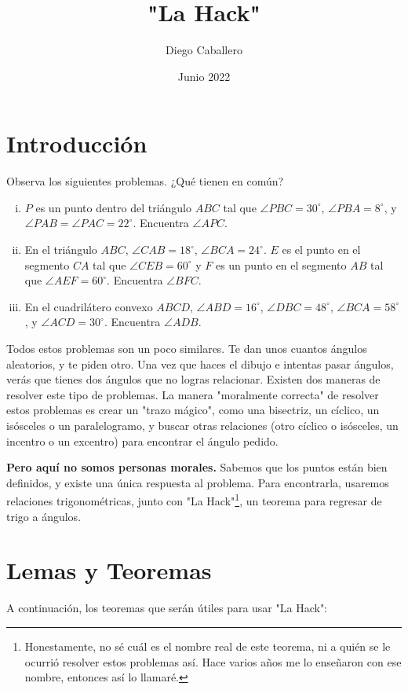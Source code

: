 \documentclass[11pt]{scrartcl}
\begin{document}
\title{"La Hack"}
\date{Junio 2022}
\author{Diego Caballero}
\maketitle

\section{Introducción}
    Observa los siguientes problemas. ¿Qué tienen en común?
    \begin{enumerate}[i)]
        \item $P$ es un punto dentro del triángulo $ABC$ tal que $\angle PBC = 30^{\circ}$, $\angle PBA = 8^{\circ}$, y $\angle PAB = \angle PAC = 22^{\circ}$. Encuentra $\angle APC$.

        \item En el triángulo $ABC$, $\angle CAB = 18^{\circ}$, $\angle BCA = 24 ^{\circ}$. $E$ es el punto en el segmento $CA$ tal que $\angle CEB = 60^{\circ}$ y $F$ es un punto en el segmento $AB$ tal que $\angle AEF = 60^{\circ}$. Encuentra $\angle BFC$.

        \item En el cuadrilátero convexo $ABCD$, $\angle ABD = 16^{\circ}$, $\angle DBC = 48^{\circ}$, $\angle BCA = 58^{\circ}$, y $\angle ACD = 30^{\circ}$. Encuentra $\angle ADB$.
    \end{enumerate}

    Todos estos problemas son un poco similares. Te dan unos cuantos ángulos aleatorios, y te piden otro. Una vez que haces el dibujo e intentas pasar ángulos, verás que tienes dos ángulos que no logras relacionar. Existen dos maneras de resolver este tipo de problemas. La manera "moralmente correcta" de resolver estos problemas es crear un "trazo mágico", como una bisectriz, un cíclico, un isósceles o un paralelogramo, y buscar otras relaciones (otro cíclico o isósceles, un incentro o un excentro) para encontrar el ángulo pedido.

    \textbf{Pero aquí no somos personas morales.} Sabemos que los puntos están bien definidos, y existe una única respuesta al problema. Para encontrarla, usaremos relaciones trigonométricas, junto con "La Hack"\footnote{Honestamente, no sé cuál es el nombre real de este teorema, ni a quién se le ocurrió resolver estos problemas así. Hace varios años me lo enseñaron con ese nombre, entonces así lo llamaré.}, un teorema para regresar de trigo a ángulos.

\section{Lemas y Teoremas}
    A continuación, los teoremas que serán útiles para usar "La Hack":
\end{document}
